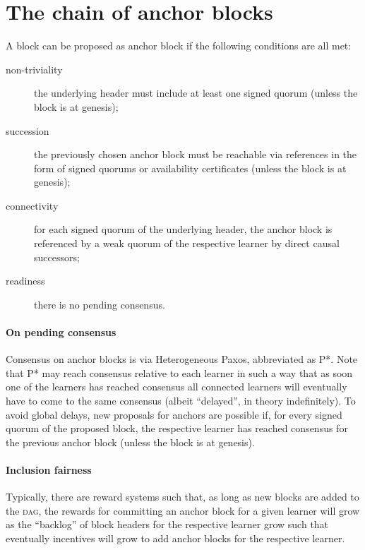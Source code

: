 \documentclass[%
dvipsnames
]{article}
\theoremstyle{definition}
\newcommand{\Dag}[1][]{\textsc{dag}#1\xspace}
\renewcommand{\todo}[2][]{}
\begin{document}
\section{The chain of anchor blocks}
\label{sec:anchor-blocks}

A block can be proposed as anchor block if the following conditions are all met:
\begin{description}
\item[non-triviality] %
  the underlying header must include at least one signed quorum
  (unless the block is at genesis);
\item[succession] %
  the previously chosen anchor block must be reachable via references
  in the form of signed quorums or availability certificates %
  (unless the block is at genesis);
\item[connectivity] %
  for each signed quorum of the underlying header, %
  the anchor block is referenced by a weak quorum of the respective learner %
  by direct causal successors; %
\item[readiness] there is no pending consensus. %
\end{description}

\paragraph{On pending consensus} %
Consensus on anchor blocks is via Heterogeneous Paxos, abbreviated as P*.\xspace%
\todo{hope this is still good to go.}%
Note that P* may reach consensus relative to each learner %
in such a way that as soon one of the learners has reached consensus %
all connected learners will eventually have to come to the same consensus
(albeit ``delayed'', in theory indefinitely). %
To avoid global delays, %
new proposals for anchors are possible
if, for every signed quorum of the proposed block, %
the respective learner has reached consensus for the previous anchor block %
(unless the block is at genesis). %

\paragraph{Inclusion fairness} %
Typically, %
there are reward systems such that, %
as long as new blocks are added to the \Dag, %
the rewards for committing an anchor block for a given learner will grow %
as the ``backlog'' of block headers for the respective learner grow %
such that eventually incentives will grow to add anchor blocks for the
respective learner. %

\printbibliography
\end{document}
